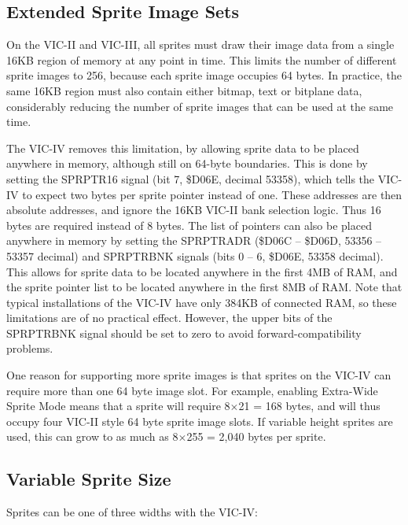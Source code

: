 \subsection{Extended Sprite Image Sets}

On the VIC-II and VIC-III, all sprites must draw their image data from a single 16KB region of memory at any point in time.
This limits the number of different sprite images to 256, because each sprite image occupies 64 bytes.  In practice, the same
16KB region must also contain either bitmap, text or bitplane data, considerably reducing the number of sprite images that
can be used at the same time.

The VIC-IV removes this limitation, by allowing sprite data to be placed anywhere in memory, although still on 64-byte
boundaries. This is done by setting the SPRPTR16 signal (bit 7, \$D06E, decimal 53358), which tells the VIC-IV to expect
two bytes per sprite pointer instead of one.  These addresses are then absolute addresses, and ignore the 16KB VIC-II
bank selection logic.  Thus 16 bytes are required instead of 8 bytes.  The list of pointers can also be placed anywhere
in memory by setting the SPRPTRADR (\$D06C -- \$D06D, 53356 -- 53357 decimal) and SPRPTRBNK signals (bits 0 -- 6, \$D06E, 53358 decimal).
This allows for sprite data to be located anywhere in the first 4MB of RAM, and the sprite pointer list to be located anywhere
in the first 8MB of RAM.  Note that typical installations of the VIC-IV have only 384KB of connected RAM, so these limitations are
of no practical effect. However, the upper bits of the SPRPTRBNK signal should be set to zero to avoid forward-compatibility
problems.

One reason for supporting more sprite images is that sprites on the VIC-IV can require more than one 64 byte image slot.
For example, enabling Extra-Wide Sprite Mode means that a sprite will require 8$\times$21 = 168 bytes, and will thus occupy
four VIC-II style 64 byte sprite image slots.  If variable height sprites are used, this can grow to as much as  8$\times$255 = 2,040 bytes per sprite.

\subsection{Variable Sprite Size}

Sprites can be one of three widths with the VIC-IV:

